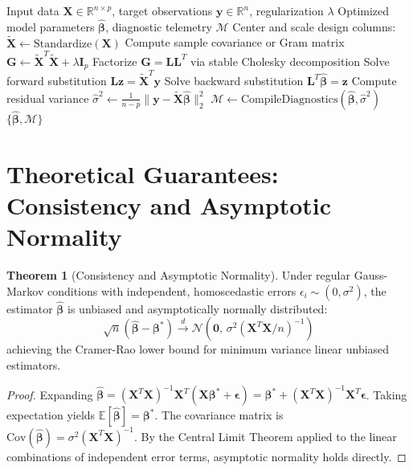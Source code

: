 \documentclass[11pt,a4paper]{article}
\theoremstyle{definition}
\newtheorem{theorem}{\textbf{Theorem}}[section]
\begin{document}
\begin{algorithm}[H]
\caption{Histogram-based gradient boosting Execution}
\begin{algorithmic}[1]
\Require Input data $\mathbf{X} \in \mathbb{R}^{n \times p}$, target observations $\mathbf{y} \in \mathbb{R}^n$, regularization $\lambda$
\Ensure Optimized model parameters $\hat{\boldsymbol{\beta}}$, diagnostic telemetry $\mathcal{M}$
\State Center and scale design columns: $\tilde{\mathbf{X}} \gets \text{Standardize}(\mathbf{X})$
\State Compute sample covariance or Gram matrix $\mathbf{G} \gets \tilde{\mathbf{X}}^T \tilde{\mathbf{X}} + \lambda \mathbf{I}_p$
\State Factorize $\mathbf{G} = \mathbf{L} \mathbf{L}^T$ via stable Cholesky decomposition
\State Solve forward substitution $\mathbf{L} \mathbf{z} = \tilde{\mathbf{X}}^T \mathbf{y}$
\State Solve backward substitution $\mathbf{L}^T \hat{\boldsymbol{\beta}} = \mathbf{z}$
\State Compute residual variance $\hat{\sigma}^2 \gets \frac{1}{n - p} \| \mathbf{y} - \tilde{\mathbf{X}} \hat{\boldsymbol{\beta}} \|_2^2$
\State $\mathcal{M} \gets \text{CompileDiagnostics}(\hat{\boldsymbol{\beta}}, \hat{\sigma}^2)$
\State \Return $\{\hat{\boldsymbol{\beta}}, \mathcal{M}\}$
\end{algorithmic}
\end{algorithm}

\section{Theoretical Guarantees: Consistency and Asymptotic Normality}

\begin{theorem}[Consistency and Asymptotic Normality]
Under regular Gauss-Markov conditions with independent, homoscedastic errors $\epsilon_i \sim (0, \sigma^2)$, the estimator $\hat{\boldsymbol{\beta}}$ is unbiased and asymptotically normally distributed:
\begin{equation}
\sqrt{n}(\hat{\boldsymbol{\beta}} - \boldsymbol{\beta}^*) \xrightarrow{d} \mathcal{N}\left(\mathbf{0}, \, \sigma^2 (\mathbf{X}^T \mathbf{X} / n)^{-1}\right)
\end{equation}
achieving the Cramer-Rao lower bound for minimum variance linear unbiased estimators.
\end{theorem}

\begin{proof}
Expanding $\hat{\boldsymbol{\beta}} = (\mathbf{X}^T \mathbf{X})^{-1} \mathbf{X}^T (\mathbf{X} \boldsymbol{\beta}^* + \boldsymbol{\epsilon}) = \boldsymbol{\beta}^* + (\mathbf{X}^T \mathbf{X})^{-1} \mathbf{X}^T \boldsymbol{\epsilon}$.
Taking expectation yields $\mathbb{E}[\hat{\boldsymbol{\beta}}] = \boldsymbol{\beta}^*$. The covariance matrix is $\text{Cov}(\hat{\boldsymbol{\beta}}) = \sigma^2 (\mathbf{X}^T \mathbf{X})^{-1}$. By the Central Limit Theorem applied to the linear combinations of independent error terms, asymptotic normality holds directly.
\end{proof}
\end{document}
